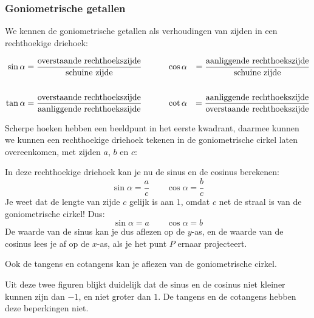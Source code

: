 \subsubsection{Goniometrische getallen}

We kennen de goniometrische getallen als verhoudingen van zijden in een rechthoekige driehoek:

\begin{align*}
\sin \alpha &= \frac{\textup{overstaande rechthoekszijde}}{\textup{schuine zijde}} &\qquad & \cos \alpha &= \frac{\textup{aanliggende rechthoekszijde}}{\textup{schuine zijde}}\\
&&\\
\tan \alpha &= \frac{\textup{overstaande rechthoekszijde}}{\textup{aanliggende rechthoekszijde}}&\qquad &\cot \alpha &= \frac{\textup{aanliggende rechthoekszijde}}{\textup{overstaande rechthoekszijde}}\\
\end{align*}

Scherpe hoeken hebben een beeldpunt in het eerste kwadrant, daarmee kunnen we kunnen een rechthoekige driehoek tekenen in de goniometrische cirkel laten overeenkomen, met zijden $a$, $b$ en $c$:
 
\begin{figure}[H]
	\centering 
	 
\end{figure}


In deze rechthoekige driehoek kan je nu de sinus en de cosinus berekenen:
\[\sin \alpha = \frac{a}{c} \qquad \cos \alpha = \frac{b}{c}\]
Je weet dat de lengte van zijde $c$ gelijk is aan $1$, omdat $c$ net de straal is van de goniometrische cirkel! Dus:
\[\sin \alpha = a \qquad \cos \alpha = b\]
De waarde van de sinus kan je dus aflezen op de $y$-as, en de waarde van de cosinus lees je af op de $x$-as, als je het punt $P$ ernaar projecteert.


\begin{figure}[H]
	\centering 
	 
\end{figure}

Ook de tangens en cotangens kan je aflezen van de goniometrische cirkel.
 
\begin{figure}[H]
	\centering 
	 
\end{figure}

Uit deze twee figuren blijkt duidelijk dat de sinus en de cosinus niet kleiner kunnen zijn dan $-1$, en niet groter dan $1$. De tangens en de cotangens hebben deze beperkingen niet.


